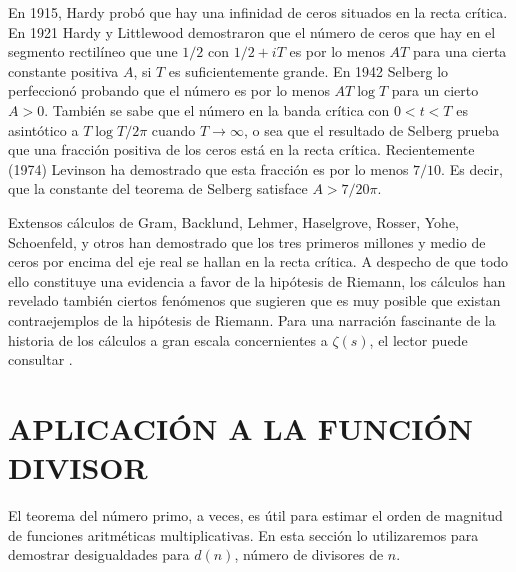     En 1915, Hardy probó que hay una infinidad de ceros situados en la recta crítica. En 1921
    Hardy y Littlewood demostraron que el número de ceros que hay en el segmento rectilíneo
    que une $1/2$ con $1/2+iT$ es por lo menos $AT$ para una cierta constante positiva $A$,
    si $T$ es suficientemente grande. En 1942 Selberg lo perfeccionó probando que el número es
    por lo menos $AT\log T$ para un cierto $A>0$. También se sabe que el número en la banda
    crítica con $0<t<T$ es asintótico a $T\log T/2\pi$ cuando $T\to\infty$, o sea que el
    resultado de Selberg prueba que una fracción positiva de los ceros está en la recta
    crítica. Recientemente (1974) Levinson ha demostrado que esta fracción es por lo menos
    $7/10$. Es decir, que la constante del teorema de Selberg satisface $A>7/20\pi$.

    Extensos cálculos de Gram, Backlund, Lehmer, Haselgrove, Rosser, Yohe, Schoenfeld, y otros
    han demostrado que los tres primeros millones y medio de ceros por encima del eje real se
    hallan en la recta crítica. A despecho de que todo ello constituye una evidencia a favor de
    la hipótesis de Riemann, los cálculos han revelado también ciertos fenómenos que sugieren
    que es muy posible que existan contraejemplos de la hipótesis de Riemann. Para una
    narración fascinante de la historia de los cálculos a gran escala concernientes a
    $\zeta(s)$, el lector puede consultar \cite{edwards1974}.

    \section{APLICACIÓN A LA FUNCIÓN DIVISOR}

    El teorema del número primo, a veces, es útil para estimar el orden de magnitud de
    funciones aritméticas multiplicativas. En esta sección lo utilizaremos para demostrar
    desigualdades para $d(n)$, número de divisores de $n$.

